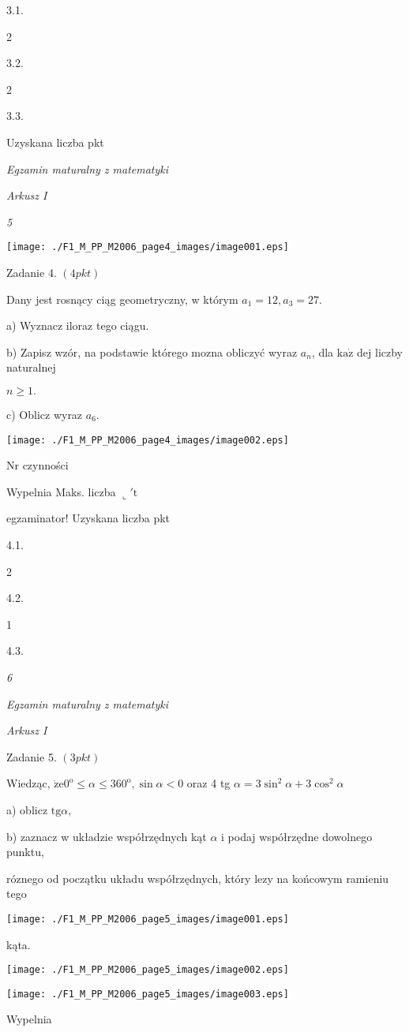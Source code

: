 \documentclass[a4paper,12pt]{article}
\begin{document}
3.1.

2

3.2.

2

3.3.

Uzyskana liczba pkt





{\it Egzamin maturalny z matematyki}

{\it Arkusz I}

{\it 5}
\begin{center}
\texttt{[image: ./F1\_M\_PP\_M2006\_page4\_images/image001.eps]}
\end{center}
Zadanie 4. $(4pkt)$

Dany jest rosnący ciąg geometryczny, w którym $a_{1}=12, a_{3}=27.$

a) Wyznacz iloraz tego ciągu.

b) Zapisz wzór, na podstawie którego mozna obliczyć wyraz $a_{n}$, dla $\mathrm{k}\mathrm{a}\dot{\mathrm{z}}$ dej liczby naturalnej

$n\geq 1.$

c) Oblicz wyraz $a_{6}.$
\begin{center}
\texttt{[image: ./F1\_M\_PP\_M2006\_page4\_images/image002.eps]}
\end{center}
Nr czynności

Wypelnia Maks. liczba $\llcorner\prime \mathrm{t}$

egzaminator! Uzyskana liczba pkt

4.1.

2

4.2.

1

4.3.





{\it 6}

{\it Egzamin maturalny z matematyki}

{\it Arkusz I}

Zadanie 5. $(3pkt)$

Wiedząc, $\dot{\mathrm{z}}\mathrm{e}0^{\mathrm{o}}\leq\alpha\leq 360^{\mathrm{o}}, \sin\alpha<0$ oraz 4 tg $\alpha=3\sin^{2}\alpha+3\cos^{2}\alpha$

a) oblicz $\mathrm{t}\mathrm{g}\alpha,$

b) zaznacz w układzie współrzędnych kąt $\alpha$ i podaj współrzędne dowolnego punktu,

róznego od początku układu współrzędnych, który lezy na końcowym ramieniu tego
\begin{center}
\texttt{[image: ./F1\_M\_PP\_M2006\_page5\_images/image001.eps]}
\end{center}
kąta.
\begin{center}
\texttt{[image: ./F1\_M\_PP\_M2006\_page5\_images/image002.eps]}

\texttt{[image: ./F1\_M\_PP\_M2006\_page5\_images/image003.eps]}
\end{center}
Wypelnia
\end{document}

